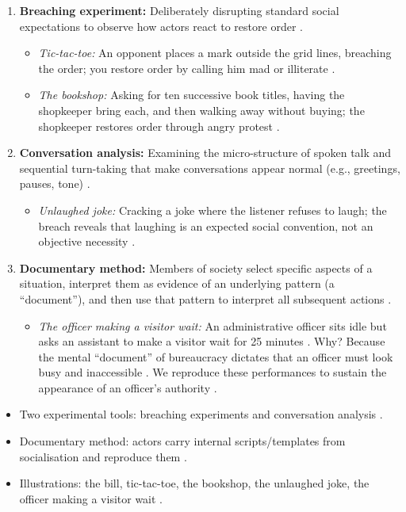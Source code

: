 \begin{enumerate}
    \item \textbf{Breaching experiment:} Deliberately disrupting standard social expectations to observe how actors react to restore order .
    \begin{itemize}
        \item \textit{Tic-tac-toe:} An opponent places a mark outside the grid lines, breaching the order; you restore order by calling him mad or illiterate .
        \item \textit{The bookshop:} Asking for ten successive book titles, having the shopkeeper bring each, and then walking away without buying; the shopkeeper restores order through angry protest .
    \end{itemize}
    \item \textbf{Conversation analysis:} Examining the micro-structure of spoken talk and sequential turn-taking that make conversations appear normal (e.g., greetings, pauses, tone) .
    \begin{itemize}
        \item \textit{Unlaughed joke:} Cracking a joke where the listener refuses to laugh; the breach reveals that laughing is an expected social convention, not an objective necessity .
    \end{itemize}
    \item \textbf{Documentary method:} Members of society select specific aspects of a situation, interpret them as evidence of an underlying pattern (a ``document''), and then use that pattern to interpret all subsequent actions .
    \begin{itemize}
        \item \textit{The officer making a visitor wait:} An administrative officer sits idle but asks an assistant to make a visitor wait for 25 minutes . Why? Because the mental ``document'' of bureaucracy dictates that an officer must look busy and inaccessible . We reproduce these performances to sustain the appearance of an officer's authority .
    \end{itemize}
\end{enumerate}

\begin{QuickRevision}
\begin{itemize}
    \item Two experimental tools: breaching experiments and conversation analysis .
    \item Documentary method: actors carry internal scripts/templates from socialisation and reproduce them .
    \item Illustrations: the bill, tic-tac-toe, the bookshop, the unlaughed joke, the officer making a visitor wait .
\end{itemize}
\end{QuickRevision}

